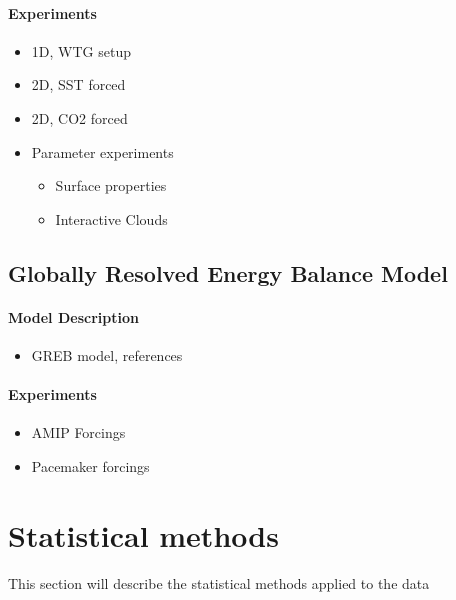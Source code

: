 \paragraph{Experiments}
\begin{itemize}
	\item 1D, WTG setup
	\item 2D, SST forced
	\item 2D, CO2 forced
	\item Parameter experiments
\begin{itemize}
	\item Surface properties
	\item Interactive Clouds
\end{itemize}
\end{itemize}


\subsection{Globally Resolved Energy Balance Model}

\paragraph{Model Description}
\begin{itemize}
	\item GREB model, references
\end{itemize}


\paragraph{Experiments}
\begin{itemize}
	\item AMIP Forcings
	\item Pacemaker forcings
\end{itemize}


\section{Statistical methods}

This section will describe the statistical methods applied to the data


